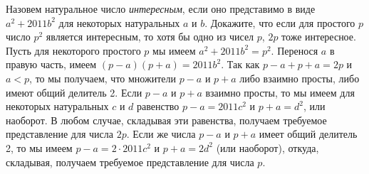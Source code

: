 \problem{}
Назовем натуральное число \emph{интересным}, если оно представимо в виде
$a^2 + 2011 b^2$ для некоторых натуральных $a$ и $b$.
Докажите, что если для простого $p$ число $p^2$ является интересным, то хотя бы
одно из чисел $p$, $2 p$ тоже интересное.
\solution
Пусть для некоторого простого $p$ мы имеем $a^2 + 2011 b^2 = p^2$.
Перенося $a$ в правую часть, имеем $(p - a) (p + a) = 2011 b^2$.
Так как $p - a + p + a = 2 p$ и $a < p$, то мы получаем, что множители $p - a$
и $p + a$ либо взаимно просты, либо имеют общий делитель 2.
Если $p - a$ и $p + a$ взаимно просты, то мы имеем для некоторых натуральных
$c$ и $d$ равенство $p - a = 2011 c^2$ и $p + a = d^2$, или наоборот.
В любом случае, складывая эти равенства, получаем требуемое представление для
числа $2 p$.
Если же числа $p - a$ и $p + a$ имеет общий делитель 2, то мы имеем
$p - a = 2 \cdot 2011 c^2$ и $p + a = 2 d^2$ (или наоборот), откуда, складывая,
получаем требуемое представление для числа $p$.
\endproblem
